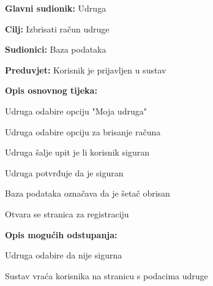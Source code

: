 					
					\noindent {}
					\begin{packed_item}
	
						\item \textbf{Glavni sudionik:} Udruga
						\item  \textbf{Cilj:} Izbrisati račun udruge
						\item  \textbf{Sudionici:} Baza podataka
						\item  \textbf{Preduvjet:} Korisnik je prijavljen u sustav
						\item  \textbf{Opis osnovnog tijeka:}
						
						\item[] \begin{packed_enum}
	
							\item Udruga odabire opciju "Moja udruga"
							\item Udruga odabire opciju za brisanje računa
							\item Udruga šalje upit je li korisnik siguran
							\item Udruga potvrđuje da je siguran
							\item Baza podataka označava da je šetač obrisan
							\item Otvara se stranica za registraciju
	
						\end{packed_enum}
						
						\item  \textbf{Opis mogućih odstupanja:}
						
						\item[] \begin{packed_item}
							\item[4.a] Udruga odabire da nije sigurna
							\item[] \begin{packed_enum}
								\item Sustav vraća korisnika na stranicu s podacima udruge
							\end{packed_enum}
	
						\end{packed_item}
					\end{packed_item}
					
					
					
